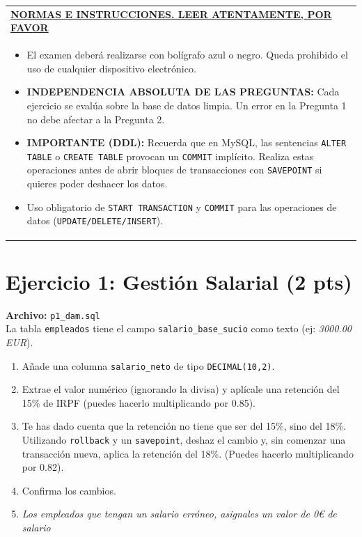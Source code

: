 \documentclass[12pt,a4paper]{article}
\begin{document}
\vspace{0.5cm}

\noindent
\begin{tabularx}{\textwidth}{|X|}
    \hline
    \textbf{\underline{NORMAS E INSTRUCCIONES. LEER ATENTAMENTE, POR FAVOR}} \\
    \begin{itemize}[label=$\blacksquare$, leftmargin=1cm, nosep, after=\vspace{0.2cm}]
        \item El examen deberá realizarse con bolígrafo azul o negro. Queda prohibido el uso de cualquier dispositivo electrónico.
        \item \textbf{INDEPENDENCIA ABSOLUTA DE LAS PREGUNTAS:} Cada ejercicio se evalúa sobre la base de datos limpia. Un error en la Pregunta 1 no debe afectar a la Pregunta 2.
        \item \textbf{IMPORTANTE (DDL):} Recuerda que en MySQL, las sentencias \texttt{ALTER TABLE} o \texttt{CREATE TABLE} provocan un \texttt{COMMIT} implícito. Realiza estas operaciones antes de abrir bloques de transacciones con \texttt{SAVEPOINT} si quieres poder deshacer los datos.
        \item Uso obligatorio de \texttt{START TRANSACTION} y \texttt{COMMIT} para las operaciones de datos (\texttt{UPDATE/DELETE/INSERT}).
    \end{itemize} \\ \hline
\end{tabularx}

\vspace{0.5cm}

\section{Ejercicio 1: Gestión Salarial (2 pts)}
\textbf{Archivo:} \texttt{p1\_dam.sql} \\
La tabla \texttt{empleados} tiene el campo \texttt{salario\_base\_sucio} como texto (ej: \textit{3000.00 EUR}).
\begin{enumerate}
    \item Añade una columna \texttt{salario\_neto} de tipo \texttt{DECIMAL(10,2)}.
    \item Extrae el valor numérico (ignorando la divisa) y aplícale una retención del 15\% de IRPF (puedes hacerlo multiplicando por 0.85).
    \item Te has dado cuenta que la retención no tiene que ser del 15\%, sino del 18\%. Utilizando \texttt{rollback} y un \texttt{savepoint}, deshaz el cambio y, sin comenzar una transacción nueva, aplica la retención del 18\%. (Puedes hacerlo multiplicando por 0.82).
    \item Confirma los cambios.
    \item \textit{Los empleados que tengan un salario erróneo, asignales un valor de 0€ de salario}
\end{enumerate}
\end{document}
